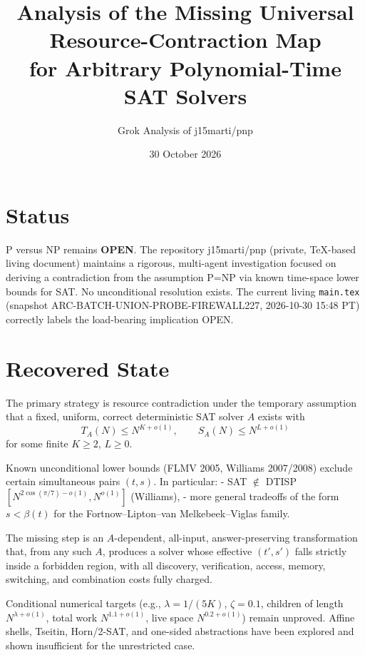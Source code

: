 \documentclass[11pt]{article}
\title{Analysis of the Missing Universal Resource-Contraction Map\\for Arbitrary Polynomial-Time SAT Solvers}
\author{Grok Analysis of j15marti/pnp}
\date{30 October 2026}
\begin{document}
\maketitle

\section{Status}
P versus NP remains \textbf{OPEN}. The repository j15marti/pnp (private, TeX-based living document) maintains a rigorous, multi-agent investigation focused on deriving a contradiction from the assumption P=NP via known time-space lower bounds for SAT. No unconditional resolution exists. The current living \texttt{main.tex} (snapshot ARC-BATCH-UNION-PROBE-FIREWALL227, 2026-10-30 15:48 PT) correctly labels the load-bearing implication OPEN.

\section{Recovered State}
The primary strategy is resource contradiction under the temporary assumption that a fixed, uniform, correct deterministic SAT solver \(A\) exists with
\[
T_A(N) \le N^{K+o(1)}, \qquad S_A(N) \le N^{L+o(1)}
\]
for some finite \(K \ge 2\), \(L \ge 0\).

Known unconditional lower bounds (FLMV 2005, Williams 2007/2008) exclude certain simultaneous pairs \((t,s)\). In particular:
- SAT \(\notin\) DTISP\([N^{2\cos(\pi/7)-o(1)}, N^{o(1)}]\) (Williams),
- more general tradeoffs of the form \(s < \beta(t)\) for the Fortnow--Lipton--van Melkebeek--Viglas family.

The missing step is an \(A\)-dependent, all-input, answer-preserving transformation that, from any such \(A\), produces a solver whose effective \((t',s')\) falls strictly inside a forbidden region, with all discovery, verification, access, memory, switching, and combination costs fully charged.

Conditional numerical targets (e.g., \(\lambda=1/(5K)\), \(\zeta=0.1\), children of length \(N^{\lambda+o(1)}\), total work \(N^{1.1+o(1)}\), live space \(N^{0.2+o(1)}\)) remain unproved. Affine shells, Tseitin, Horn/2-SAT, and one-sided abstractions have been explored and shown insufficient for the unrestricted case.
\end{document}
